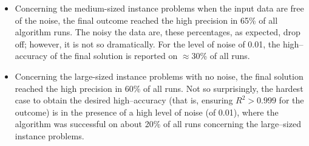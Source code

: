 \documentclass{bmcart}
\begin{document}
\begin{itemize}
	\item Concerning  the medium-sized instance problems when the input data are free of the noise,   the final outcome reached the high precision in 65\% of all algorithm runs.    The noisy the data are, these percentages, as expected, drop off; however, it is not so dramatically. For the level of noise of 0.01, the high--accuracy of the final solution is reported on $\approx$30\% of all runs.
	
	\item Concerning  the large-sized instance problems with no noise, the  final solution reached the high precision in 60\% of all runs. Not so surprisingly, the hardest case to obtain the desired high--accuracy (that is, ensuring $R^2> 0.999$ for  the  outcome) is in the presence of a high level of noise (of 0.01), where the algorithm was successful on about 20\% of all runs concerning the large--sized instance problems. 
	
\end{itemize}


\begin{center}
	\label{fig:compExact_noise_size}
\end{center}
\end{document}
